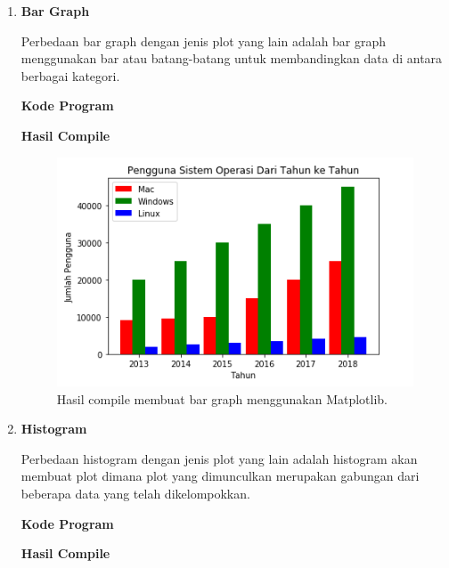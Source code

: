 \begin{enumerate}
	\item \textbf{Bar Graph}
	
	Perbedaan bar graph dengan jenis plot yang lain adalah bar graph menggunakan bar atau batang-batang untuk membandingkan data di antara berbagai kategori.
	
	\textbf{Kode Program}
	
	
	
	\textbf{Hasil Compile}
	
	\begin{figure}[H]
		\includegraphics[width=12cm]{figures/6/1174042/2.png}
		\centering
		\caption{Hasil compile membuat bar graph menggunakan Matplotlib.}
	\end{figure}
	
	\item \textbf{Histogram}
	
	Perbedaan histogram dengan jenis plot yang lain adalah histogram akan membuat plot dimana plot yang dimunculkan merupakan gabungan dari beberapa data yang telah dikelompokkan.
	
	\textbf{Kode Program}
	
	
	
	\textbf{Hasil Compile}
	

\end{enumerate}
